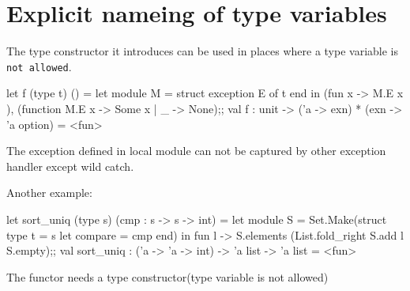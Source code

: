 \section{Explicit nameing of type variables}
\label{sec:expl-name-type}

The type constructor it introduces can be used in places where a type
variable is \verb|not allowed|.

\begin{ocamlcode}
let f (type t) () = 
    let module M = struct exception E of t end in
    (fun x -> M.E x ), (function M.E x -> Some x | _ -> None);;
val f : unit -> ('a -> exn) * (exn -> 'a option) = <fun>  
\end{ocamlcode}

The exception defined in local module can not be captured by other
exception handler except wild catch.

Another example:
\begin{ocamlcode}
let sort_uniq (type s) (cmp : s -> s -> int) = 
    let module S = Set.Make(struct type t = s let compare = cmp end) in 
    fun l -> S.elements (List.fold_right S.add l S.empty);;
val sort_uniq : ('a -> 'a -> int) -> 'a list -> 'a list = <fun>  
\end{ocamlcode}
The functor needs a type constructor(type variable is not allowed)
